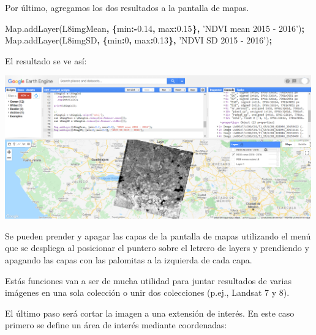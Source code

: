 \documentclass[
]{article}
\newenvironment{Shaded}{\begin{snugshade}}{\end{snugshade}}
\newcommand{\AttributeTok}[1]{\textcolor[rgb]{0.77,0.63,0.00}{#1}}
\newcommand{\DataTypeTok}[1]{\textcolor[rgb]{0.13,0.29,0.53}{#1}}
\newcommand{\DecValTok}[1]{\textcolor[rgb]{0.00,0.00,0.81}{#1}}
\newcommand{\FloatTok}[1]{\textcolor[rgb]{0.00,0.00,0.81}{#1}}
\newcommand{\NormalTok}[1]{#1}
\newcommand{\OperatorTok}[1]{\textcolor[rgb]{0.81,0.36,0.00}{\textbf{#1}}}
\newcommand{\StringTok}[1]{\textcolor[rgb]{0.31,0.60,0.02}{#1}}
\newcommand{\VariableTok}[1]{\textcolor[rgb]{0.00,0.00,0.00}{#1}}
\begin{document}
Por último, agregamos los dos resultados a la pantalla de mapas.

\begin{Shaded}
\begin{Highlighting}[]
\VariableTok{Map}\NormalTok{.}\AttributeTok{addLayer}\NormalTok{(L8imgMean}\OperatorTok{,} \OperatorTok{\{}\DataTypeTok{min}\OperatorTok{:-}\FloatTok{0.14}\OperatorTok{,} \DataTypeTok{max}\OperatorTok{:}\FloatTok{0.15}\OperatorTok{\},} \StringTok{'NDVI mean 2015 - 2016'}\NormalTok{)}\OperatorTok{;}
\VariableTok{Map}\NormalTok{.}\AttributeTok{addLayer}\NormalTok{(L8imgSD}\OperatorTok{,} \OperatorTok{\{}\DataTypeTok{min}\OperatorTok{:}\DecValTok{0}\OperatorTok{,} \DataTypeTok{max}\OperatorTok{:}\FloatTok{0.13}\OperatorTok{\},} \StringTok{'NDVI SD 2015 - 2016'}\NormalTok{)}\OperatorTok{;}
\end{Highlighting}
\end{Shaded}

El resultado se ve así:

\includegraphics[width=500px]{Img/imNDVI}

Se pueden prender y apagar las capas de la pantalla de mapas utilizando
el menú que se despliega al posicionar el puntero sobre el letrero de
layers y prendiendo y apagando las capas con las palomitas a la
izquierda de cada capa.

Estás funciones van a ser de mucha utilidad para juntar resultados de
varias imágenes en una sola colección o unir dos colecciones (p.ej.,
Landsat 7 y 8).

El último paso será cortar la imagen a una extensión de interés. En este
caso primero se define un área de interés mediante coordenadas:
\end{document}
